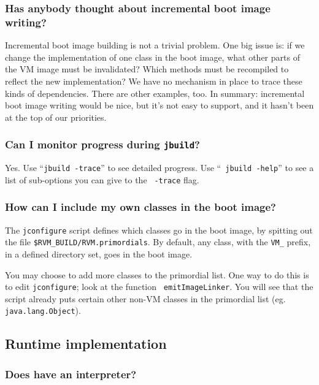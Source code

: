 \subsubsection{Has anybody thought about incremental boot image writing?}%
%

Incremental boot image building is not a trivial problem.  One big
issue is: if we change the implementation of one class in the boot image,
what other parts of the VM image must be invalidated?  Which
methods must be recompiled to reflect the new implementation?  We have no
mechanism in place to trace these kinds of dependencies.  There are other
examples, too.  In summary: incremental boot image writing would be nice,
but it's not easy to support, and it hasn't been at the top of our
priorities.

\subsubsection{Can I monitor progress during {\tt jbuild}?}

Yes.  Use ``{\tt jbuild -trace}'' to see detailed progress.  Use ``{\tt
jbuild -help}'' to see a list of sub-options you can give to the {\tt
-trace} flag.

\subsubsection{How can I include my own classes in the boot image?}

The {\tt jconfigure} script defines which classes go in the boot image, by
spitting out the file {\tt \$RVM\_\-BUILD/\-RVM.primordials}.  By default, any
class, with the {\tt VM\_} prefix, in a defined directory set, goes in the
boot image.

You may choose to add more classes to the primordial list.  One way to do
this is to edit {\tt jconfigure}; look at the function {\tt
emitImageLinker}.  You will see that the script already puts certain other
non-VM classes in the primordial list (eg. {\tt java.lang.Object}).

\subsection{Runtime implementation}

\subsubsection{Does \jrvm{} have an interpreter?}

